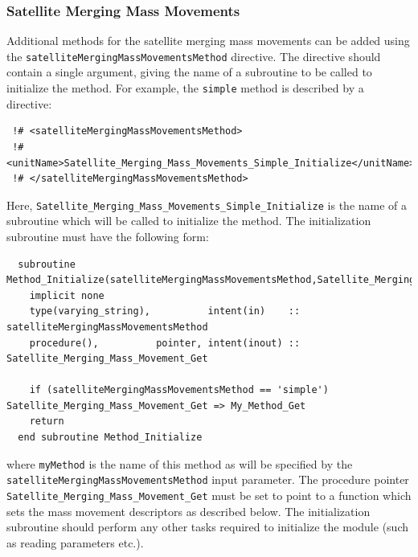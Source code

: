\subsubsection{Satellite Merging Mass Movements}

Additional methods for the satellite merging mass movements can be added using the {\tt satelliteMergingMassMovementsMethod} directive. The directive should contain a single argument, giving the name of a subroutine to be called to initialize the method. For example, the {\tt simple} method is described by a directive:
\begin{verbatim}
 !# <satelliteMergingMassMovementsMethod>
 !#  <unitName>Satellite_Merging_Mass_Movements_Simple_Initialize</unitName>
 !# </satelliteMergingMassMovementsMethod>
\end{verbatim}
Here, {\tt Satellite\_Merging\_Mass\_Movements\_Simple\_Initialize} is the name of a subroutine which will be called to initialize the method. The initialization subroutine must have the following form:
\begin{verbatim}
  subroutine Method_Initialize(satelliteMergingMassMovementsMethod,Satellite_Merging_Mass_Movement_Get)
    implicit none
    type(varying_string),          intent(in)    :: satelliteMergingMassMovementsMethod
    procedure(),          pointer, intent(inout) :: Satellite_Merging_Mass_Movement_Get
    
    if (satelliteMergingMassMovementsMethod == 'simple') Satellite_Merging_Mass_Movement_Get => My_Method_Get
    return
  end subroutine Method_Initialize
\end{verbatim}
where {\tt myMethod} is the name of this method as will be specified by the {\tt satelliteMergingMassMovementsMethod} input parameter. The procedure pointer {\tt Satellite\_Merging\_Mass\_Movement\_Get} must be set to point to a function which sets the mass movement descriptors as described below. The initialization subroutine should perform any other tasks required to initialize the module (such as reading parameters etc.).

